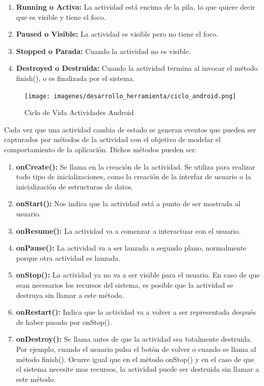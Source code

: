 \documentclass[a4paper,11pt]{book}
\begin{document}
\begin{enumerate}
\item \textbf{Running o Activa:} La actividad está encima de la pila, lo que quiere decir que es visible y tiene el foco.
\item \textbf{Paused o Visible:} La actividad es visible pero no tiene el foco. 
\item \textbf{Stopped o Parada:} Cuando la actividad no es visible. 
\item \textbf{Destroyed o Destruida:} Cuando la actividad termina al invocar el método finish(), o es finalizada por el sistema. 
\end{enumerate}

\begin{figure}[H] 
\centering 
\texttt{[image: imagenes/desarrollo\_herramienta/ciclo\_android.png]}
\caption{ Ciclo de Vida Actividades Android\cite{colD}}
\end{figure}

Cada vez que una actividad cambia de estado se generan eventos que pueden ser capturados por métodos de la actividad con el objetivo de modelar el comportamiento de la aplicación. Dichos métodos pueden ser: 
\begin{enumerate}
\item \textbf{onCreate():} Se llama en la creación de la actividad. Se utiliza para realizar todo tipo de inicializaciones, como la creación de la interfaz de usuario o la inicialización de estructuras de datos. 
\item \textbf{onStart():} Nos indica que la actividad está a punto de ser mostrada al usuario.
\item \textbf{onResume():} La actividad va a comenzar a interactuar con el usuario. 
\item \textbf{onPause():} La actividad va a ser lanzada a segundo plano, normalmente porque otra actividad es lanzada. 
\item \textbf{onStop():} La actividad ya no va a ser visible para el usuario. En caso de que sean necesarios los recursos del sistema, es posible que la actividad se destruya sin llamar a este método.
\item \textbf{onRestart():} Indica que la actividad va a volver a ser representada después de haber pasado por onStop().
\item \textbf{onDestroy():} Se llama antes de que la actividad sea totalmente destruida. Por ejemplo, cuando el usuario pulsa el botón de volver o cuando se llama al método finish(). Ocurre igual que en el método onStop() y en el caso de que el sistema necesite mas recursos, la actividad puede ser destruida sin llamar a este método. 
\end{enumerate}
\end{document}
